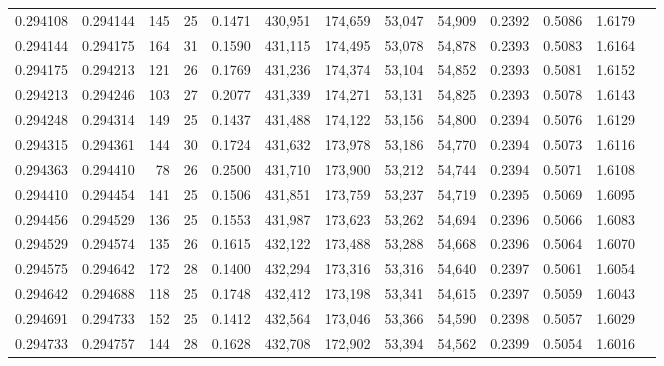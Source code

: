 \begin{tabular}{rrrrrrrrrrrrr}
0.294108 & 0.294144 &   145 &  25 &                                     0.1471 & 430,951 & 174,659 &  53,047 &  54,909 & 0.2392 & 0.5086 & 1.6179 \\
0.294144 & 0.294175 &   164 &  31 &                                     0.1590 & 431,115 & 174,495 &  53,078 &  54,878 & 0.2393 & 0.5083 & 1.6164 \\
0.294175 & 0.294213 &   121 &  26 &                                     0.1769 & 431,236 & 174,374 &  53,104 &  54,852 & 0.2393 & 0.5081 & 1.6152 \\
0.294213 & 0.294246 &   103 &  27 &                                     0.2077 & 431,339 & 174,271 &  53,131 &  54,825 & 0.2393 & 0.5078 & 1.6143 \\
0.294248 & 0.294314 &   149 &  25 &                                     0.1437 & 431,488 & 174,122 &  53,156 &  54,800 & 0.2394 & 0.5076 & 1.6129 \\
0.294315 & 0.294361 &   144 &  30 &                                     0.1724 & 431,632 & 173,978 &  53,186 &  54,770 & 0.2394 & 0.5073 & 1.6116 \\
0.294363 & 0.294410 &    78 &  26 &                                     0.2500 & 431,710 & 173,900 &  53,212 &  54,744 & 0.2394 & 0.5071 & 1.6108 \\
0.294410 & 0.294454 &   141 &  25 &                                     0.1506 & 431,851 & 173,759 &  53,237 &  54,719 & 0.2395 & 0.5069 & 1.6095 \\
0.294456 & 0.294529 &   136 &  25 &                                     0.1553 & 431,987 & 173,623 &  53,262 &  54,694 & 0.2396 & 0.5066 & 1.6083 \\
0.294529 & 0.294574 &   135 &  26 &                                     0.1615 & 432,122 & 173,488 &  53,288 &  54,668 & 0.2396 & 0.5064 & 1.6070 \\
0.294575 & 0.294642 &   172 &  28 &                                     0.1400 & 432,294 & 173,316 &  53,316 &  54,640 & 0.2397 & 0.5061 & 1.6054 \\
0.294642 & 0.294688 &   118 &  25 &                                     0.1748 & 432,412 & 173,198 &  53,341 &  54,615 & 0.2397 & 0.5059 & 1.6043 \\
0.294691 & 0.294733 &   152 &  25 &                                     0.1412 & 432,564 & 173,046 &  53,366 &  54,590 & 0.2398 & 0.5057 & 1.6029 \\
0.294733 & 0.294757 &   144 &  28 &                                     0.1628 & 432,708 & 172,902 &  53,394 &  54,562 & 0.2399 & 0.5054 & 1.6016 \\

\end{tabular}

